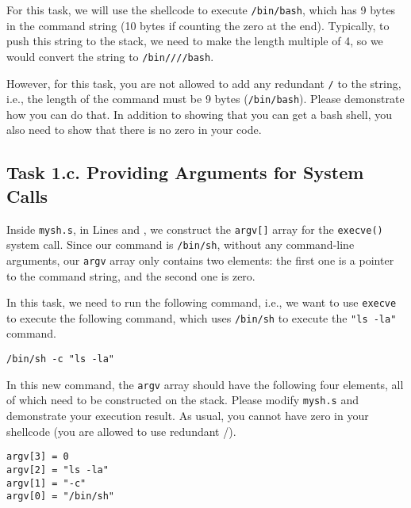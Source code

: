 For this task, we will use the shellcode to execute
\texttt{/bin/bash}, which has 9 bytes in the command string (10 bytes if 
counting the zero at the end). Typically, to push
this string to the stack, we need to make the length
multiple of 4, so we would convert the string
to \texttt{/bin////bash}. 

However, for this task,   
you are not allowed to add any
redundant \texttt{/} to the string, i.e., the length of the 
command must be 9 bytes (\texttt{/bin/bash}).
Please demonstrate how you can do that.
In addition to showing that you can get a bash shell, you also
need to show that there is no zero in your code. 



\subsection{Task 1.c. Providing Arguments for System Calls}
 
Inside \texttt{mysh.s}, in Lines  and ,
we construct the \texttt{argv[]} array for the 
\texttt{execve()} system call. Since 
our command is \texttt{/bin/sh}, without any command-line
arguments, our \texttt{argv} array only contains 
two elements: the first one is a pointer to 
the command string, and the second one is zero. 

In this task, we need to run the 
following command, i.e., we want to use 
\texttt{execve} to execute the following command, which
uses \texttt{/bin/sh} to execute the \texttt{"ls -la"}
command. 

\begin{lstlisting}
/bin/sh -c "ls -la"
\end{lstlisting}

In this new command, the \texttt{argv} array should have 
the following four elements, all of which need to be 
constructed on the stack. Please modify \texttt{mysh.s} and 
demonstrate your execution result. As usual, you cannot have 
zero in your shellcode (you are allowed to use redundant /). 

\begin{lstlisting}
argv[3] = 0
argv[2] = "ls -la"
argv[1] = "-c"
argv[0] = "/bin/sh"
\end{lstlisting}
 


